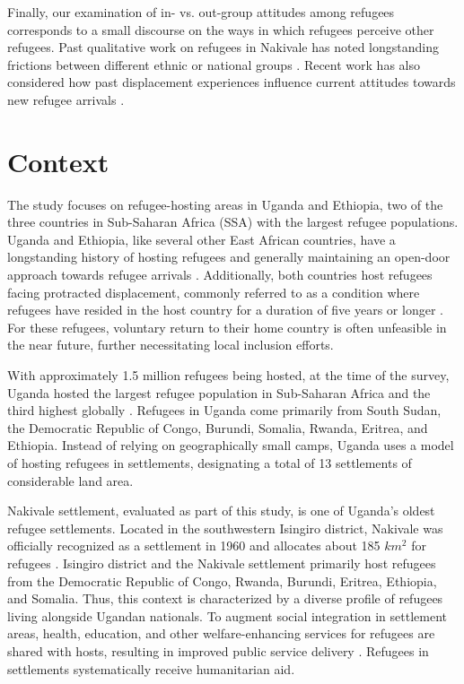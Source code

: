 \documentclass[a4paper,12pt]{article}
\begin{document}
Finally, our examination of in- vs. out-group attitudes among refugees corresponds to a small discourse on the ways in which refugees perceive other refugees. Past qualitative work on refugees in Nakivale has noted longstanding frictions between different ethnic or national groups \citep{bjorkhaug2020revisiting}. Recent work has also considered how past displacement experiences influence current attitudes towards new refugee arrivals \citep{gihleb2022exposure}. 

    
\section{Context}


The study focuses on refugee-hosting areas in Uganda and Ethiopia, two of the three countries in Sub-Saharan Africa (SSA) with the largest refugee populations. Uganda and Ethiopia, like several other East African countries, have a longstanding history of hosting refugees and generally maintaining an open-door approach towards refugee arrivals \citep{UNHCR2022RSS, UNHCR2020OPM}. Additionally, both countries host refugees facing protracted displacement, commonly referred to as a condition where refugees have resided in the host country for a duration of five years or longer \citep{milner2011responding}. For these refugees, voluntary return to their home country is often unfeasible in the near future, further necessitating local inclusion efforts. 


With approximately 1.5 million refugees being hosted, at the time of the survey, Uganda hosted the largest refugee population in Sub-Saharan Africa and the third highest globally \citep{UNHCRreport2021}. Refugees in Uganda come primarily from South Sudan, the Democratic Republic of Congo, Burundi, Somalia, Rwanda, Eritrea, and Ethiopia. Instead of relying on geographically small camps, Uganda uses a model of hosting refugees in settlements, designating a total of 13 settlements of considerable land area. 

Nakivale settlement, evaluated as part of this study, is one of Uganda's oldest refugee settlements. Located in the southwestern Isingiro district, Nakivale was officially recognized as a settlement in 1960 and allocates about 185 $km^2$ for refugees \citep{bjorkhaug2020revisiting}. Isingiro district and the Nakivale settlement primarily host refugees from the Democratic Republic of Congo, Rwanda, Burundi, Eritrea, Ethiopia, and Somalia. Thus, this context is characterized by a diverse profile of refugees living alongside Ugandan nationals. To augment social integration in settlement areas, health, education, and other welfare-enhancing services for refugees are shared with hosts, resulting in improved public service delivery \citep{zhou2022inclusive}. Refugees in settlements systematically receive humanitarian aid.
\end{document}
